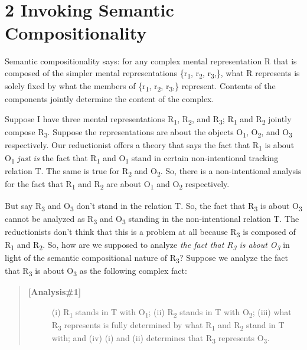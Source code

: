\documentclass[a4paper,12pt]{article}
\begin{document}
\section*{2 Invoking Semantic Compositionality}

Semantic compositionality says: for any complex mental representation R that is composed of the simpler mental representations \{r\textsubscript{1}, r\textsubscript{2}, r\textsubscript{3},\textellipsis\}, what R represents is solely fixed by what the members of \{r\textsubscript{1}, r\textsubscript{2}, r\textsubscript{3},\textellipsis\} represent. Contents of the components jointly determine the content of the complex.

Suppose I have three mental representations R\textsubscript{1}, R\textsubscript{2}, and R\textsubscript{3}; R\textsubscript{1} and R\textsubscript{2} jointly compose R\textsubscript{3}. Suppose the representations are about the objects O\textsubscript{1}, O\textsubscript{2}, and O\textsubscript{3} respectively. Our reductionist offers a theory that says the fact that R\textsubscript{1} is about O\textsubscript{1} \emph{just is} the fact that R\textsubscript{1} and O\textsubscript{1} stand in certain non-intentional tracking relation T. The same is true for R\textsubscript{2} and O\textsubscript{2}. So, there is a non-intentional analysis for the fact that R\textsubscript{1} and R\textsubscript{2} are about O\textsubscript{1} and O\textsubscript{2} respectively.

But say R\textsubscript{3} and O\textsubscript{3} don't stand in the relation T. So, the fact that R\textsubscript{3} is about O\textsubscript{3} cannot be analyzed as R\textsubscript{3} and O\textsubscript{3} standing in the non-intentional relation T. The reductionists don't think that this is a problem at all because R\textsubscript{3} is composed of R\textsubscript{1} and R\textsubscript{2}. So, how are we supposed to analyze \emph{the fact that R\textsubscript{3} is about O\textsubscript{3}} in light of the semantic compositional nature of R\textsubscript{3}? Suppose we analyze the fact that R\textsubscript{3} is about O\textsubscript{3} as the following complex fact:

\begin{quote}
\begin{description}
\item[\textbf{[Analysis\#1]}] (i) R\textsubscript{1} stands in T with O\textsubscript{1}; (ii) R\textsubscript{2} stands in T with O\textsubscript{2}; (iii) what R\textsubscript{3} represents is fully determined by what R\textsubscript{1} and R\textsubscript{2} stand in T with; and (iv) (i) and (ii) determines that R\textsubscript{3} represents O\textsubscript{3}.
\end{description}
\end{quote}
\end{document}
